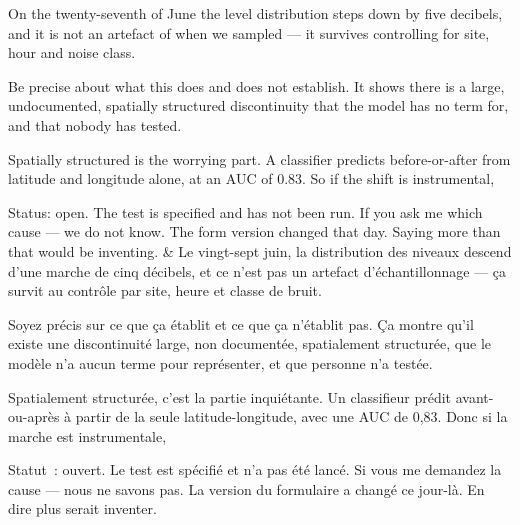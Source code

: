 \documentclass[10pt,a4paper]{article}
\begin{document}
\begin{say}
On the twenty-seventh of June the level distribution steps down by five decibels,
and it is not an artefact of when we sampled --- it survives controlling for site,
hour and noise class.

Be precise about what this does and does not establish.  It shows there is a large, undocumented, spatially
structured discontinuity that the model has no term for, and that nobody has
tested.

Spatially structured is the worrying part. A classifier predicts before-or-after
from latitude and longitude alone, at an AUC of 0.83. So if the shift is
instrumental, 

Status: open. The test is specified and has not been run. If you ask me which
cause --- we do not know. The form version changed that day. Saying more than that
would be inventing.
&
Le vingt-sept juin, la distribution des niveaux descend d'une marche de cinq
décibels, et ce n'est pas un artefact d'échantillonnage --- ça survit au contrôle
par site, heure et classe de bruit.

Soyez précis sur ce que ça établit et ce que ça n'établit pas.  Ça montre qu'il existe une discontinuité large, non
documentée, spatialement structurée, que le modèle n'a aucun terme pour
représenter, et que personne n'a testée.

Spatialement structurée, c'est la partie inquiétante. Un classifieur prédit
avant-ou-après à partir de la seule latitude-longitude, avec une AUC de 0,83. Donc
si la marche est instrumentale, 

Statut~: ouvert. Le test est spécifié et n'a pas été lancé. Si vous me demandez la
cause --- nous ne savons pas. La version du formulaire a changé ce jour-là. En dire
plus serait inventer.
\end{say}
\end{document}
